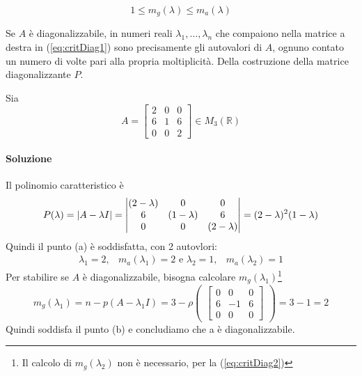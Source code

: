 \begin{equation}
  \label{eq:critDiag2}
  1\leq m_g(\lambda)\leq m_a(\lambda)
\end{equation}
\begin{oss}
  Se $A$ è diagonalizzabile, in numeri reali $\lambda_1,\dots,\lambda_n$ che compaiono nella matrice a destra in
  (\ref{eq:critDiag1}) sono precisamente gli autovalori di $A$, ognuno contato un numero di volte pari alla
  propria moltiplicità. Della costruzione della matrice diagonalizzante $P$.  
\end{oss}
\begin{esempio}
  Sia
  \begin{equation}
    \label{eq:critDiag3}
    A=
    \begin{bmatrix}
      2 & 0 & 0\\
      6 & 1 & 6\\
      0 & 0 & 2
    \end{bmatrix} \in M_3(\mathds{R})
  \end{equation}
\paragraph{Soluzione}
Il polinomio caratteristico è
\begin{equation}
  \label{eq:critDiag4}
  P(\lambda)=\lvert A-\lambda I\rvert=
  \begin{vmatrix}
    (2 - \lambda) & 0 & 0\\
    6 & (1-\lambda) & 6\\
    0 & 0 & (2-\lambda)
  \end{vmatrix}=(2-\lambda)^2(1-\lambda)
\end{equation}
Quindi il punto (a) è soddisfatta, con 2 autovlori:
\begin{equation}
  \label{eq:critDiag5}
  \begin{matrix}
    \lambda_{1}=2, & m_a(\lambda_1)=2 \text{ e } \lambda_2=1, & m_a(\lambda_2)=1 
  \end{matrix}
\end{equation} 
\clearpage
Per stabilire se $A$ è diagonalizzabile, bisogna calcolare $m_g(\lambda_1)$\footnote{Il calcolo di $m_g(\lambda_2)$ non
è necessario, per la (\ref{eq:critDiag2})}
\begin{equation}
  \label{eq:critDiag6}
  m_g (\lambda_1)=n-p(A-\lambda_1I)=3-\rho
  \begin{pmatrix}
    \begin{bmatrix}
      0 & 0 & 0\\
      6 & -1 & 6\\
      0 & 0 & 0
    \end{bmatrix}
  \end{pmatrix}
  =3-1=2
\end{equation}
Quindi soddisfa il punto (b) e concludiamo che a è diagonalizzabile.
\end{esempio}
